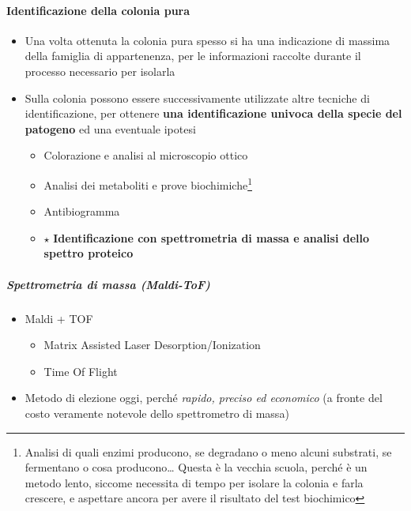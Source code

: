 \documentclass[italian,]{article}
\providecommand{\tightlist}{%
  \setlength{\itemsep}{0pt}\setlength{\parskip}{0pt}}
\begin{document}
\hypertarget{identificazione-della-colonia-pura}{%
\paragraph{Identificazione della colonia
pura}\label{identificazione-della-colonia-pura}}

\begin{itemize}
\tightlist
\item
  Una volta ottenuta la colonia pura spesso si ha una indicazione di
  massima della famiglia di appartenenza, per le informazioni raccolte
  durante il processo necessario per isolarla
\item
  Sulla colonia possono essere successivamente utilizzate altre tecniche
  di identificazione, per ottenere \textbf{una identificazione univoca
  della specie del patogeno} ed una eventuale ipotesi

  \begin{itemize}
  \tightlist
  \item
    Colorazione e analisi al microscopio ottico
  \item
    Analisi dei metaboliti e prove biochimiche\footnote{Analisi di quali
      enzimi producono, se degradano o meno alcuni substrati, se
      fermentano o cosa producono\ldots{} Questa è la vecchia scuola,
      perché è un metodo lento, siccome necessita di tempo per isolare
      la colonia e farla crescere, e aspettare ancora per avere il
      risultato del test biochimico}
  \item
    Antibiogramma
  \item
    \(\star\) \textbf{Identificazione con spettrometria di massa e
    analisi dello spettro proteico}
  \end{itemize}
\end{itemize}

\hypertarget{spettrometria-di-massa-maldi-tof}{%
\subparagraph{Spettrometria di massa
(Maldi-ToF)}\label{spettrometria-di-massa-maldi-tof}}

\begin{itemize}
\tightlist
\item
  Maldi + TOF

  \begin{itemize}
  \tightlist
  \item
    Matrix Assisted Laser Desorption/Ionization
  \item
    Time Of Flight
  \end{itemize}
\item
  Metodo di elezione oggi, perché \emph{rapido, preciso ed economico} (a
  fronte del costo veramente notevole dello spettrometro di massa)
\end{itemize}
\end{document}
